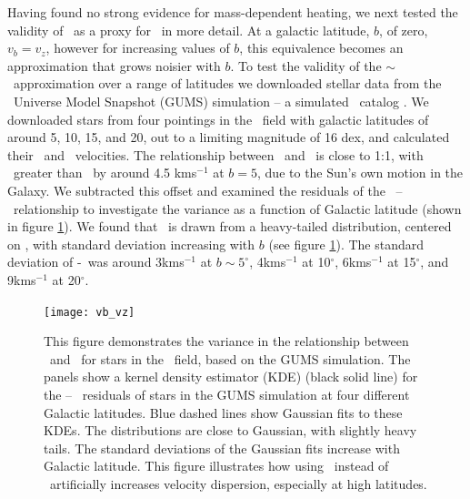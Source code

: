 Having found no strong evidence for mass-dependent heating, we next tested
the validity of \vb\ as a proxy for \vz\ in more detail.
At a galactic latitude, $b$, of zero, $v_b=v_z$, however for increasing values
of $b$, this equivalence becomes an approximation that grows noisier with $b$.
To test the validity of the \vb$\sim$\vz\ approximation over a range of
latitudes we downloaded stellar data from the \Gaia\ Universe Model Snapshot
(GUMS) simulation -- a simulated \Gaia\ catalog \citep{robin2012}.
We downloaded stars from four pointings in the \kepler\ field with galactic
latitudes of around 5\degrees, 10\degrees, 15\degrees, and 20\degrees, out to
a limiting magnitude of 16 dex, and calculated their \vz\ and \vb\ velocities.
The relationship between \vz\ and \vb\ is close to 1:1, with \vz\ greater than
\vb\ by around 4.5 kms$^{-1}$ at $b=5$, due to the Sun's own motion in the
Galaxy.
We subtracted this offset and examined the residuals of the \vz\ -- \vb\
relationship to investigate the variance as a function of Galactic latitude
(shown in figure \ref{fig:vb_vz}).
We found that \vb\ is drawn from a heavy-tailed distribution, centered on \vz,
with standard deviation increasing with $b$ (see figure \ref{fig:vb_vz}).
The standard deviation of \vz-\vb\ was around 3kms$^{-1}$ at $b \sim 5^\circ
$, 4kms$^{-1}$ at 10$^\circ$, 6kms$^{-1}$ at 15$^\circ$, and 9kms$^{-1}$ at
20$^\circ$.

\begin{figure}
  \caption{
This figure demonstrates the variance in the relationship between \vb\ and
    \vz\ for stars in the \kepler\ field, based on the GUMS simulation.
The panels show a kernel density estimator (KDE) (black solid line) for
    the \vz -- \vb\ residuals of stars in the GUMS simulation at four
    different Galactic latitudes.
Blue dashed lines show Gaussian fits to these KDEs.
The distributions are close to Gaussian, with slightly heavy tails.
The standard deviations of the Gaussian fits increase with Galactic latitude.
This figure illustrates how using \vb\ instead of \vz\ artificially
    increases velocity dispersion, especially at high latitudes.
}
  \centering
    \texttt{[image: vb\_vz]}
\label{fig:vb_vz}
\end{figure}

